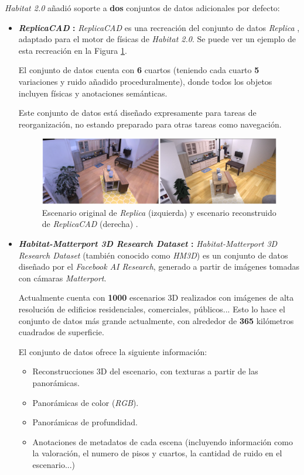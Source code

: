 \textit{Habitat 2.0} añadió soporte a \textbf{dos} conjuntos de datos adicionales por defecto:
\begin{itemize}
	\item \textbf{\textit{ReplicaCAD} \cite{szot2021habitat}:} \textit{ReplicaCAD} es una recreación del conjunto de datos \textit{Replica} \cite{DBLP:journals/corr/abs-1906-05797}, adaptado para el motor de físicas de \textit{Habitat 2.0}. Se puede ver un ejemplo de esta recreación en la Figura \ref{fig:chap4-replicaCAD}.
	
	El conjunto de datos cuenta con \textbf{6} cuartos (teniendo cada cuarto \textbf{5} variaciones y ruido añadido proceduralmente), donde todos los objetos incluyen físicas y anotaciones semánticas.
	
	Este conjunto de datos está diseñado expresamente para tareas de reorganización, no estando preparado para otras tareas como navegación.
	
\begin{figure}[h]
    \centering
    \includegraphics[width=\textwidth]{imagenes/cap4/replicaCAD.png}
    \caption{Escenario original de \textit{Replica} (izquierda) y escenario reconstruido de \textit{ReplicaCAD} (derecha) \cite{szot2021habitat}.}
    \label{fig:chap4-replicaCAD}
\end{figure}	
	
	\item \textbf{\textit{Habitat-Matterport 3D Research Dataset} \cite{habitatmp3d}:} \textit{Habitat-Matterport 3D Research Dataset} (también conocido como \textit{HM3D}) es un conjunto de datos diseñado por el \textit{Facebook AI Research}, generado a partir de imágenes tomadas con cámaras \textit{Matterport}.
	
	Actualmente cuenta con \textbf{1000} escenarios 3D realizados con imágenes de alta resolución de edificios residenciales, comerciales, públicos... Esto lo hace el conjunto de datos más grande actualmente, con alrededor de \textbf{365} kilómetros cuadrados de superficie.
	
	El conjunto de datos ofrece la siguiente información:
	
	\begin{itemize}
		\item Reconstrucciones 3D del escenario, con texturas a partir de las panorámicas.
		\item Panorámicas de color (\textit{RGB}).
		\item Panorámicas de profundidad.
		\item Anotaciones de metadatos de cada escena (incluyendo información como la valoración, el numero de pisos y cuartos, la cantidad de ruido en el escenario...)
	\end{itemize}
	

\end{itemize}

